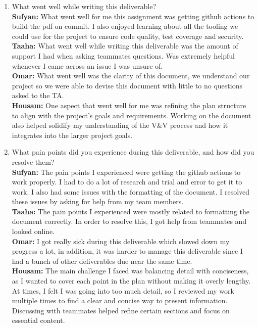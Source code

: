 \documentclass[12pt, titlepage]{article}
\begin{document}
\begin{enumerate}
  \item What went well while writing this deliverable? \\
  \textbf{Sufyan:} What went well for me this assignment was getting github actions to build the pdf on commit. I also enjoyed learning about all the tooling we could use for the project to ensure code quality, test coverage and security. \\
  \textbf{Taaha:} What went well while writing this deliverable was the amount of support I had when asking teammates questions. Was extremely helpful whenever I came across an issue I was unsure of. \\
  \textbf{Omar:} What went well was the clarity of this document, we understand our project so we were able to devise this document with little to no questions asked to the TA. \\
  \textbf{Housam:} One aspect that went well for me was refining the plan structure to align with the project’s goals and requirements. Working on the document also helped solidify my understanding of the V\&V process and how it integrates into the larger project goals.

  \item What pain points did you experience during this deliverable, and how
    did you resolve them? \\
  \textbf{Sufyan:} The pain points I experienced were getting the github actions to work properly. I had to do a lot of research and trial and error to get it to work. I also had some issues with the formatting of the document. I resolved these issues by asking for help from my team members. \\
  \textbf{Taaha:} The pain points I experienced were mostly related to formatting the document correctly. In order to resolve this, I got help from teammates and looked online. \\
  \textbf{Omar:} I got really sick during this deliverable which slowed down my progress a lot, in addition, it was harder to manage this deliverable since I had a bunch of other deliverables due near the same time. \\
  \textbf{Housam:} The main challenge I faced was balancing detail with conciseness, as I wanted to cover each point in the plan without making it overly lengthy. At times, I felt I was going into too much detail, so I reviewed my work multiple times to find a clear and concise way to present information. Discussing with teammates helped refine certain sections and focus on essential content.


\end{enumerate}
\end{document}
